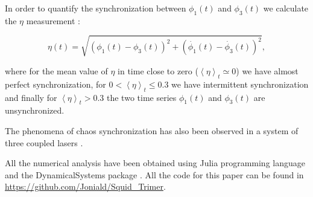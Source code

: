 \documentclass[aps,pre,reprint,groupedaddress]{revtex4-1}
\begin{document}
In order to quantify the synchronization between $\phi_{1}(t)$ and $\phi_{3}(t)$ we calculate the $\eta$ measurement \cite{Baker1998}:

\begin{equation} \label{}
\eta(t) =\sqrt{ (\phi_{1}(t)-\phi_{3}(t))^{2} + (\dot{\phi_{1}}(t)- \dot{\phi_{3}}(t))^{2} }, 
\end{equation}

where for the mean value of $\eta$ in time close to zero ($\left\langle \eta\right\rangle _{t} \simeq 0$) we have almost perfect synchronization, for $0 < \left\langle \eta \right\rangle _{t} \leqslant 0.3$ we have intermittent synchronization and finally for $\left\langle \eta \right\rangle _{t} > 0.3$ the two time series $\phi_{1}(t)$ and $\phi_{3}(t)$ are unsynchronized. 

The phenomena of chaos synchronization has also been observed in a system of three coupled lasers \cite{Winful1990}.

All the numerical analysis have been obtained using Julia programming language and the DynamicalSystems package \cite{Datseris2018}. All the code for this paper can be found in \url{https://github.com/Joniald/Squid_Trimer}.
\end{document}
